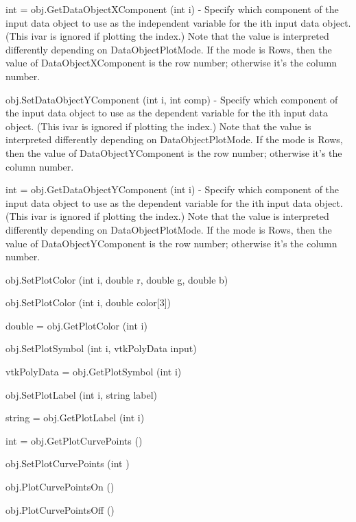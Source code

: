 \begin{DoxyItemize}
\item {\ttfamily int = obj.\-Get\-Data\-Object\-X\-Component (int i)} -\/ Specify which component of the input data object to use as the independent variable for the ith input data object. (This ivar is ignored if plotting the index.) Note that the value is interpreted differently depending on Data\-Object\-Plot\-Mode. If the mode is Rows, then the value of Data\-Object\-X\-Component is the row number; otherwise it's the column number.  
\item {\ttfamily obj.\-Set\-Data\-Object\-Y\-Component (int i, int comp)} -\/ Specify which component of the input data object to use as the dependent variable for the ith input data object. (This ivar is ignored if plotting the index.) Note that the value is interpreted differently depending on Data\-Object\-Plot\-Mode. If the mode is Rows, then the value of Data\-Object\-Y\-Component is the row number; otherwise it's the column number.  
\item {\ttfamily int = obj.\-Get\-Data\-Object\-Y\-Component (int i)} -\/ Specify which component of the input data object to use as the dependent variable for the ith input data object. (This ivar is ignored if plotting the index.) Note that the value is interpreted differently depending on Data\-Object\-Plot\-Mode. If the mode is Rows, then the value of Data\-Object\-Y\-Component is the row number; otherwise it's the column number.  
\item {\ttfamily obj.\-Set\-Plot\-Color (int i, double r, double g, double b)}  
\item {\ttfamily obj.\-Set\-Plot\-Color (int i, double color\mbox{[}3\mbox{]})}  
\item {\ttfamily double = obj.\-Get\-Plot\-Color (int i)}  
\item {\ttfamily obj.\-Set\-Plot\-Symbol (int i, vtk\-Poly\-Data input)}  
\item {\ttfamily vtk\-Poly\-Data = obj.\-Get\-Plot\-Symbol (int i)}  
\item {\ttfamily obj.\-Set\-Plot\-Label (int i, string label)}  
\item {\ttfamily string = obj.\-Get\-Plot\-Label (int i)}  
\item {\ttfamily int = obj.\-Get\-Plot\-Curve\-Points ()}  
\item {\ttfamily obj.\-Set\-Plot\-Curve\-Points (int )}  
\item {\ttfamily obj.\-Plot\-Curve\-Points\-On ()}  
\item {\ttfamily obj.\-Plot\-Curve\-Points\-Off ()}  

\end{DoxyItemize}
